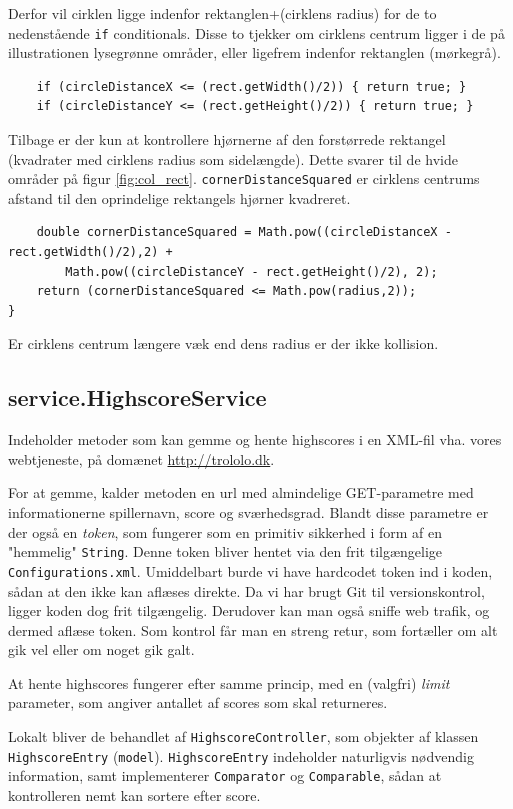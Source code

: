 \documentclass[titlepage,danish]{article}
\newcommand{\code}[1]{\texttt{#1}}
\begin{document}
Derfor vil cirklen ligge indenfor rektanglen+(cirklens radius) for de to nedenstående \code{if}
conditionals. Disse to tjekker om cirklens centrum ligger i de på illustrationen lysegrønne områder,
eller ligefrem indenfor rektanglen (mørkegrå).
\begin{verbatim}
    if (circleDistanceX <= (rect.getWidth()/2)) { return true; } 
    if (circleDistanceY <= (rect.getHeight()/2)) { return true; }
\end{verbatim}	    
Tilbage er der kun at kontrollere hjørnerne af den forstørrede rektangel (kvadrater med cirklens
radius som sidelængde). Dette svarer til de hvide områder på figur \ref{fig:col_rect}.
\code{cornerDistanceSquared} er cirklens centrums afstand til den oprindelige rektangels hjørner
kvadreret.
\begin{verbatim}
    double cornerDistanceSquared = Math.pow((circleDistanceX - rect.getWidth()/2),2) + 
        Math.pow((circleDistanceY - rect.getHeight()/2), 2);
    return (cornerDistanceSquared <= Math.pow(radius,2));
}
\end{verbatim}
Er cirklens centrum længere væk end dens radius er der ikke kollision.


\subsection{service.HighscoreService}

Indeholder metoder som kan gemme og hente highscores i en XML-fil vha. vores webtjeneste, på domænet \url{http://trololo.dk}.

For at gemme, kalder metoden en url med almindelige GET-parametre med informationerne spillernavn, score og sværhedsgrad. Blandt disse parametre er der også en \emph{token}, som fungerer som en primitiv sikkerhed i form af en "hemmelig" \code{String}. Denne token bliver hentet via den frit tilgængelige \code{Configurations.xml}. Umiddelbart burde vi have hardcodet token ind i koden, sådan at den ikke kan aflæses direkte. Da vi har brugt Git til versionskontrol, ligger koden dog frit tilgængelig. Derudover kan man også sniffe web trafik, og dermed aflæse token. Som kontrol får man en streng retur, som fortæller om alt gik vel eller om noget gik galt.

At hente highscores fungerer efter samme princip, med en (valgfri) \emph{limit} parameter, som angiver antallet af scores som skal returneres.

Lokalt bliver de behandlet af \code{HighscoreController}, som objekter af klassen \code{HighscoreEntry} (\code{model}). \code{HighscoreEntry} indeholder naturligvis nødvendig information, samt implementerer \code{Comparator} og \code{Comparable}, sådan at kontrolleren nemt kan sortere efter score.
\end{document}
